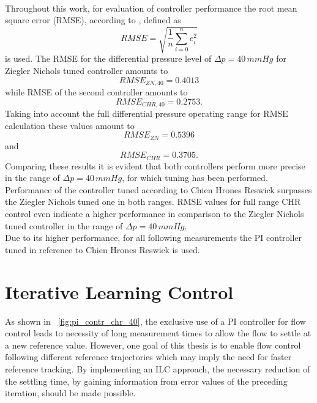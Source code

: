 \\Throughout this work, for evaluation of controller performance the root mean square error (RMSE), according to \cite{RMSE}, defined as
\begin{equation}
  RMSE = \sqrt{\frac{1}{n}\sum_{i=0}^n e_i^2}
\end{equation}
is used. The RMSE for the differential pressure level of $\Delta{p}=40\,mmHg$ for Ziegler Nichols tuned controller amounts to
\begin{equation}
  RMSE_{ZN,40}=0.4013
\end{equation}
while RMSE of the second controller amounts to
\begin{equation}
  RMSE_{CHR,40}=0.2753.
\end{equation}
Taking into account the full differential pressure operating range for RMSE calculation these values amount to
\begin{equation}
  RMSE_{ZN}=0.5396
\end{equation}
and
\begin{equation}
  RMSE_{CHR}=0.3705.
\end{equation}
Comparing these results it is evident that both controllers perform more precise in the range of $\Delta{p}=40\,mmHg$, for which tuning has been performed.
Performance of the controller tuned according to Chien Hrones Reswick surpasses the Ziegler Nichols tuned one in both ranges. RMSE values for full range CHR control even indicate a higher performance in comparison to the Ziegler Nichols tuned controller in the range of $\Delta{p}=40\,mmHg$.
\\ Due to its higher performance, for all following measurements the PI controller tuned in reference to Chien Hrones Reswick is used.
\section{Iterative Learning Control}
As shown in \figurename~\ref{fig:pi_contr_chr_40}, the exclusive use of a PI controller for flow control leads to necessity of long measurement times to allow the flow to settle at a new reference value. However, one goal of this thesis is to enable flow control following different reference trajectories which may imply the need for faster reference tracking. By implementing an ILC approach, the necessary reduction of the settling time, by gaining information from error values of the preceding iteration, should be made possible.
